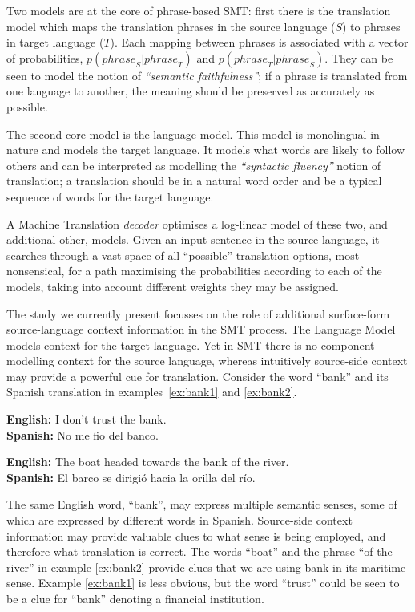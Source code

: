 \documentclass[smallextended]{svjour3}       %
\theoremstyle{break}
\begin{document}
Two models are at the core of phrase-based SMT: first there is the translation
model which maps the translation phrases in the source language ($S$) to
phrases in target language ($T$). Each mapping between phrases is associated
with a vector of probabilities, $p({phrase}_S|{phrase}_T)$ and
$p({phrase}_T|{phrase}_S)$. They can be seen to model the notion of
\emph{``semantic faithfulness''}; if a phrase is translated from one language
to another, the meaning should be preserved as accurately as possible.

The second core model is the language model. This model is monolingual
in nature and models the target language. It models what words are
likely to follow others and can be interpreted as modelling the
\emph{``syntactic fluency''} notion of translation; a translation should be
in a natural word order and be a typical sequence of words for the
target language.

A Machine Translation \emph{decoder} optimises a log-linear model of
these two, and additional other, models. Given an input sentence in
the source language, it searches through a vast space of all
``possible'' translation options, most nonsensical, for a path
maximising the probabilities according to each of the models, taking
into account different weights they may be assigned.

The study we currently present focusses on the role of additional
surface-form source-language context
information in the SMT process. The Language Model models context
for the target language. Yet in SMT there is no component modelling
context for the source language, whereas intuitively source-side context may
provide a powerful cue for translation. Consider the word ``bank'' and its
Spanish translation in examples~\ref{ex:bank1} and \ref{ex:bank2}.

\begin{exe} %
\ex \textbf{English:} I don't trust the bank. \\
    \textbf{Spanish:} No me fio del banco.
\label{ex:bank1}

\ex \textbf{English:} The boat headed towards the bank of the river. \\
    \textbf{Spanish:} El barco se dirigió hacia la orilla del río.
\label{ex:bank2}
\end{exe}

The same English word, ``bank'', may express multiple semantic senses, some of
which are expressed by different words in Spanish. Source-side context
information may provide valuable clues to what sense is being employed, and
therefore what translation is correct.  The words ``boat'' and the phrase ``of
the river'' in example \ref{ex:bank2} provide clues that we are using
bank in its maritime sense. Example \ref{ex:bank1} is less obvious, but the
word ``trust'' could be seen to be a clue for ``bank'' denoting a
financial institution.
\end{document}
